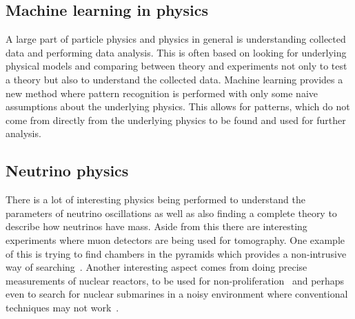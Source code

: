 \subsection{Machine learning in physics}

A large part of particle physics and physics in general is understanding collected data and performing data analysis. This is often based on looking for underlying physical models and comparing between theory and experiments not only to test a theory but also to understand the collected data. Machine learning provides a new method where pattern recognition is performed with only some naive assumptions about the underlying physics. This allows for patterns, which do not come from directly from the underlying physics to be found and used for further analysis.

\subsection{Neutrino physics}

There is a lot of interesting physics being performed to understand the parameters of neutrino oscillations as well as also finding a complete theory to describe how neutrinos have mass. Aside from this there are interesting experiments where muon detectors are being used for tomography. One example of this is trying to find chambers in the pyramids which provides a non-intrusive way of searching~\cite{86Morishima}. Another interesting aspect comes from doing precise measurements of nuclear reactors, to be used for non-proliferation~\cite{87Askins} and perhaps even to search for nuclear submarines in a noisy environment where conventional techniques may not work~\cite{88Jocher}.


